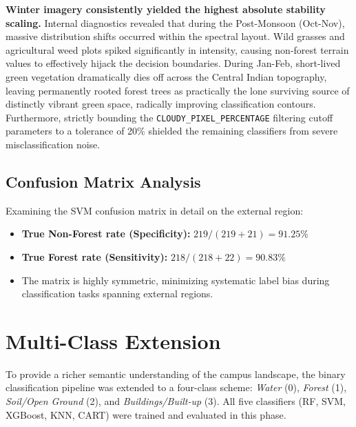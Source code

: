 \documentclass[12pt, a4paper, twocolumn]{article}
\begin{document}
\textbf{Winter imagery consistently yielded the highest absolute stability scaling.} Internal diagnostics revealed that during the Post-Monsoon (Oct-Nov), massive distribution shifts occurred within the spectral layout.
Wild grasses and agricultural weed plots spiked significantly in intensity, causing non-forest terrain values to effectively hijack the decision boundaries.
During Jan-Feb, short-lived green vegetation dramatically dies off across the Central Indian topography, leaving permanently rooted forest trees as practically the lone surviving source of distinctly vibrant green space, radically improving classification contours.
Furthermore, strictly bounding the \texttt{CLOUDY\_PIXEL\_PERCENTAGE} filtering cutoff parameters to a tolerance of 20\% shielded the remaining classifiers from severe misclassification noise.

\subsection{Confusion Matrix Analysis}

Examining the SVM confusion matrix in detail on the external region:
\begin{itemize}
    \item \textbf{True Non-Forest rate (Specificity):} $219 / (219 + 21) = 91.25\%$
    \item \textbf{True Forest rate (Sensitivity):} $218 / (218 + 22) = 90.83\%$
    \item The matrix is highly symmetric, minimizing systematic label bias during classification tasks spanning external regions.
\end{itemize}

\section{Multi-Class Extension}
\label{sec:multiclass}

To provide a richer semantic understanding of the campus landscape, the binary classification pipeline was extended to a four-class scheme: \textit{Water} (0), \textit{Forest} (1), \textit{Soil/Open Ground} (2), and \textit{Buildings/Built-up} (3).
All five classifiers (RF, SVM, XGBoost, KNN, CART) were trained and evaluated in this phase.
\end{document}
